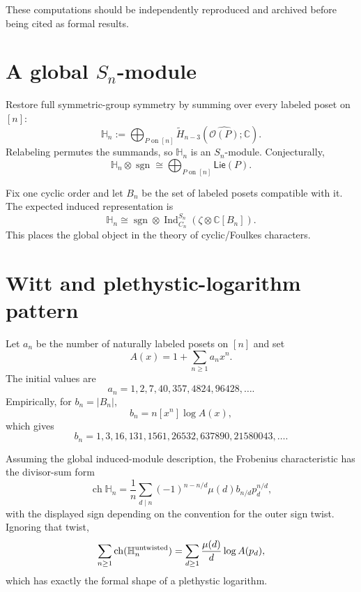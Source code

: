 \documentclass[11pt]{article}
\newcommand{\OP}{\mathcal O}
\newcommand{\sgn}{\operatorname{sgn}}
\newcommand{\Ind}{\operatorname{Ind}}
\newcommand{\ch}{\operatorname{ch}}
\newcommand{\HH}{\mathbb H}
\begin{document}
These computations should be independently reproduced and archived before
being cited as formal results.

\section{A global $S_n$-module}
Restore full symmetric-group symmetry by summing over every labeled poset on
$[n]$:
\begin{equation}
\HH_n:=\bigoplus_{P\text{ on }[n]}
\widetilde H_{n-3}(\widehat{\OP(P)};\mathbb C).
\label{eq:globalH}
\end{equation}
Relabeling permutes the summands, so $\HH_n$ is an $S_n$-module.
Conjecturally,
\[
\HH_n\otimes\sgn\cong\bigoplus_{P\text{ on }[n]}\mathsf{Lie}(P).
\]

Fix one cyclic order and let $B_n$ be the set of labeled posets compatible
with it. The expected induced representation is
\begin{equation}
\HH_n\cong\sgn\otimes
\Ind_{C_n}^{S_n}(\zeta\otimes\mathbb C[B_n]).
\label{eq:globalind}
\end{equation}
This places the global object in the theory of cyclic/Foulkes characters.

\section{Witt and plethystic-logarithm pattern}
Let $a_n$ be the number of naturally labeled posets on $[n]$ and set
\[
A(x)=1+\sum_{n\ge1}a_nx^n.
\]
The initial values are
\[
a_n=1,2,7,40,357,4824,96428,\ldots.
\]
Empirically, for $b_n=|B_n|$,
\begin{equation}
b_n=n[x^n]\log A(x),
\label{eq:bnlog}
\end{equation}
which gives
\[
b_n=1,3,16,131,1561,26532,637890,21580043,\ldots.
\]

Assuming the global induced-module description, the Frobenius characteristic
has the divisor-sum form
\begin{equation}
\ch\HH_n=
\frac1n\sum_{d\mid n}(-1)^{n-n/d}\mu(d)b_{n/d}p_d^{n/d},
\label{eq:frob}
\end{equation}
with the displayed sign depending on the convention for the outer sign
twist. Ignoring that twist,
\begin{equation}
\sum_{n\ge1}\ch(\HH_n^{\rm untwisted})
=\sum_{d\ge1}\frac{\mu(d)}{d}\log A(p_d),
\label{eq:plethlog}
\end{equation}
which has exactly the formal shape of a plethystic logarithm.
\end{document}
